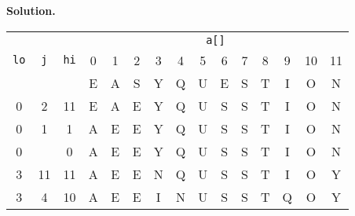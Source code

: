 \documentclass[12pt, a4paper]{article}
\newenvironment{sol}[1][Solution]
{\par\medskip\noindent \textbf{#1.} }
{\medskip}
\begin{document}
	\begin{sol}
		\begin{center}
			\begin{tabular}{ccc|cccccccccccc}
				{} & {} & {} & \multicolumn{12}{c}{\texttt{a[]}}\\
				\texttt{lo} & \texttt{j} & \texttt{hi} & 0 & 1 & 2 & 3 & 4 & 5 & 6 & 7 & 8 & 9 & 10 & 11\\
				
				\hline
				
				{} & {} & {} & {\color{black}E} & {\color{black} A} & {\color{black} S} & {\color{black} Y} & {\color{black} Q} & {\color{black} U} & {\color{black} E} & {\color{black} S} & {\color{black} T} & {\color{black} I} & {\color{black} O}
				& {\color{black} N}\\
				
				0 & {\color{red}2} & 11 & {\color{black}E} & {\color{black} A} & {\color{red} E} & {\color{black} Y} & {\color{black} Q} & {\color{black} U} & {\color{black} S} & {\color{black} S} & {\color{black} T} & {\color{black} I} & {\color{black} O}
				& {\color{black} N}\\
				
				0 & {\color{red}1} & 1 & {\color{black}A} & {\color{red} E} & {\color{gray} E} & {\color{gray} Y} & {\color{gray} Q} & {\color{gray} U} & {\color{gray} S} & {\color{gray} S} & {\color{gray} T} & {\color{gray} I} & {\color{gray} O}
				& {\color{gray} N}\\
				
				{\color{gray}0} & {} & {\color{gray}0} & {\color{red}A} & {\color{gray} E} & {\color{gray} E} & {\color{gray} Y} & {\color{gray} Q} & {\color{gray} U} & {\color{gray} S} & {\color{gray} S} & {\color{gray} T} & {\color{gray} I} & {\color{gray} O}
				& {\color{gray} N}\\
				
				{\color{black}3} & {\color{red}11} & {\color{black}11} & {\color{gray}A} & {\color{gray} E} & {\color{gray} E} & {\color{black} N} & {\color{black} Q} & {\color{black} U} & {\color{black} S} & {\color{black} S} & {\color{black} T} & {\color{black} I} & {\color{black} O} & {\color{red} Y}\\
				
				{\color{black}3} & {\color{red}4} & {\color{black}10} & {\color{gray}A} & {\color{gray} E} & {\color{gray} E} & {\color{black} I} & {\color{red} N} & {\color{black} U} & {\color{black} S} & {\color{black} S} & {\color{black} T} & {\color{black} Q} & {\color{black} O} & {\color{gray} Y}\\
				

\end{tabular}
\end{center}
\end{sol}
\end{document}
